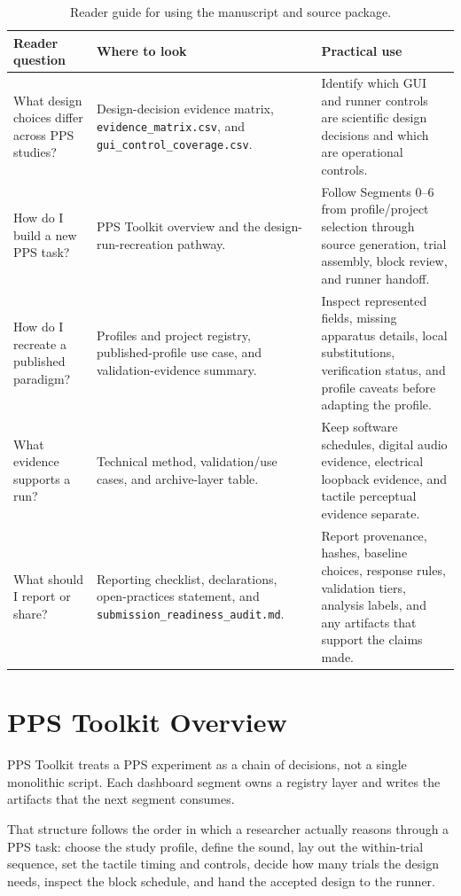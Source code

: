 \documentclass[pdflatex,sn-apa]{sn-jnl}
\newcommand{\toolkit}{PPS Toolkit}
\newcommand{\code}[1]{\texttt{#1}}
\begin{document}
\begin{table}[t]
\caption{Reader guide for using the manuscript and source package.}
\label{tab:reader-guide}
\footnotesize
\begin{tabularx}{\textwidth}{>{\raggedright\arraybackslash}p{} >{\raggedright\arraybackslash}X >{\raggedright\arraybackslash}p{}}
\toprule
Reader question & Where to look & Practical use \\
\midrule
What design choices differ across PPS studies? & Design-decision evidence matrix, \code{evidence\_matrix.csv}, and \code{gui\_control\_coverage.csv}. & Identify which GUI and runner controls are scientific design decisions and which are operational controls. \\
How do I build a new PPS task? & PPS Toolkit overview and the design-run-recreation pathway. & Follow Segments 0--6 from profile/project selection through source generation, trial assembly, block review, and runner handoff. \\
How do I recreate a published paradigm? & Profiles and project registry, published-profile use case, and validation-evidence summary. & Inspect represented fields, missing apparatus details, local substitutions, verification status, and profile caveats before adapting the profile. \\
What evidence supports a run? & Technical method, validation/use cases, and archive-layer table. & Keep software schedules, digital audio evidence, electrical loopback evidence, and tactile perceptual evidence separate. \\
What should I report or share? & Reporting checklist, declarations, open-practices statement, and \code{submission\_readiness\_audit.md}. & Report provenance, hashes, baseline choices, response rules, validation tiers, analysis labels, and any artifacts that support the claims made. \\
\bottomrule
\end{tabularx}
\end{table}

\section{PPS Toolkit Overview}

\toolkit{} treats a PPS experiment as a chain of decisions, not a single monolithic script. Each dashboard segment owns a registry layer and writes the artifacts that the next segment consumes.

That structure follows the order in which a researcher actually reasons through a PPS task: choose the study profile, define the sound, lay out the within-trial sequence, set the tactile timing and controls, decide how many trials the design needs, inspect the block schedule, and hand the accepted design to the runner.
\end{document}
